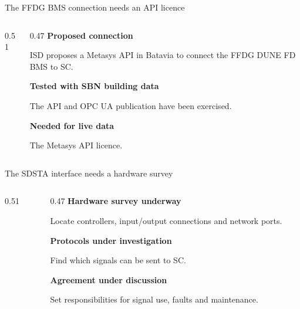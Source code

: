 \documentclass[aspectratio=169,11pt]{beamer}
\begin{document}
\begin{frame}{The FFDG BMS connection needs an API licence}
\begin{columns}[T,onlytextwidth]
\begin{column}{0.51\textwidth}
\centering\siteboundarymap
\end{column}
\begin{column}{0.47\textwidth}
\textbf{Proposed connection}\par
ISD proposes a Metasys API in Batavia to connect the FFDG DUNE FD BMS to SC.\par\bigskip
\textbf{Tested with SBN building data}\par
The API and OPC UA publication have been exercised.\par\bigskip
\textbf{Needed for live data}\par
The Metasys API licence.
\end{column}
\end{columns}\par\bigskip
\raggedright{}
\end{frame}

\begin{frame}{The SDSTA interface needs a hardware survey}
\begin{columns}[T,onlytextwidth]
\begin{column}{0.51\textwidth}
\centering\siteboundarymap
\end{column}
\begin{column}{0.47\textwidth}
\textbf{Hardware survey underway}\par
Locate controllers, input/output connections and network ports.\par\bigskip
\textbf{Protocols under investigation}\par
Find which signals can be sent to SC.\par\bigskip
\textbf{Agreement under discussion}\par
Set responsibilities for signal use, faults and maintenance.
\end{column}
\end{columns}\par\bigskip
\raggedright{}
\end{frame}
\end{document}
